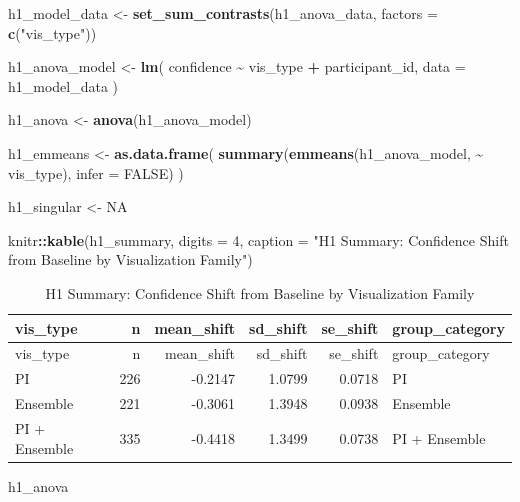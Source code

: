 \documentclass[
]{article}
\newenvironment{Shaded}{\begin{snugshade}}{\end{snugshade}}
\newcommand{\AttributeTok}[1]{\textcolor[rgb]{0.13,0.29,0.53}{#1}}
\newcommand{\ConstantTok}[1]{\textcolor[rgb]{0.56,0.35,0.01}{#1}}
\newcommand{\DecValTok}[1]{\textcolor[rgb]{0.00,0.00,0.81}{#1}}
\newcommand{\FunctionTok}[1]{\textcolor[rgb]{0.13,0.29,0.53}{\textbf{#1}}}
\newcommand{\NormalTok}[1]{#1}
\newcommand{\OtherTok}[1]{\textcolor[rgb]{0.56,0.35,0.01}{#1}}
\newcommand{\SpecialCharTok}[1]{\textcolor[rgb]{0.81,0.36,0.00}{\textbf{#1}}}
\newcommand{\StringTok}[1]{\textcolor[rgb]{0.31,0.60,0.02}{#1}}
\begin{document}
\begin{Shaded}
\begin{Highlighting}[]
\NormalTok{h1\_model\_data }\OtherTok{\textless{}{-}} \FunctionTok{set\_sum\_contrasts}\NormalTok{(h1\_anova\_data, }\AttributeTok{factors =} \FunctionTok{c}\NormalTok{(}\StringTok{"vis\_type"}\NormalTok{))}

\NormalTok{h1\_anova\_model }\OtherTok{\textless{}{-}} \FunctionTok{lm}\NormalTok{(}
\NormalTok{  confidence }\SpecialCharTok{\textasciitilde{}}\NormalTok{ vis\_type }\SpecialCharTok{+}\NormalTok{ participant\_id,}
  \AttributeTok{data =}\NormalTok{ h1\_model\_data}
\NormalTok{)}

\NormalTok{h1\_anova }\OtherTok{\textless{}{-}} \FunctionTok{anova}\NormalTok{(h1\_anova\_model)}

\NormalTok{h1\_emmeans }\OtherTok{\textless{}{-}} \FunctionTok{as.data.frame}\NormalTok{(}
  \FunctionTok{summary}\NormalTok{(}\FunctionTok{emmeans}\NormalTok{(h1\_anova\_model, }\SpecialCharTok{\textasciitilde{}}\NormalTok{ vis\_type), }\AttributeTok{infer =} \ConstantTok{FALSE}\NormalTok{)}
\NormalTok{)}

\NormalTok{h1\_singular }\OtherTok{\textless{}{-}} \ConstantTok{NA}

\NormalTok{knitr}\SpecialCharTok{::}\FunctionTok{kable}\NormalTok{(h1\_summary, }\AttributeTok{digits =} \DecValTok{4}\NormalTok{, }\AttributeTok{caption =} \StringTok{"H1 Summary: Confidence Shift from Baseline by Visualization Family"}\NormalTok{)}
\end{Highlighting}
\end{Shaded}

\begin{longtable}[]{@{}lrrrrl@{}}
\caption{H1 Summary: Confidence Shift from Baseline by Visualization
Family}\tabularnewline
\toprule\noalign{}
vis\_type & n & mean\_shift & sd\_shift & se\_shift & group\_category \\
\midrule\noalign{}
\endfirsthead
\toprule\noalign{}
vis\_type & n & mean\_shift & sd\_shift & se\_shift & group\_category \\
\midrule\noalign{}
\endhead
\bottomrule\noalign{}
\endlastfoot
PI & 226 & -0.2147 & 1.0799 & 0.0718 & PI \\
Ensemble & 221 & -0.3061 & 1.3948 & 0.0938 & Ensemble \\
PI + Ensemble & 335 & -0.4418 & 1.3499 & 0.0738 & PI + Ensemble \\
\end{longtable}

\begin{Shaded}
\begin{Highlighting}[]
\NormalTok{h1\_anova}
\end{Highlighting}
\end{Shaded}
\end{document}

